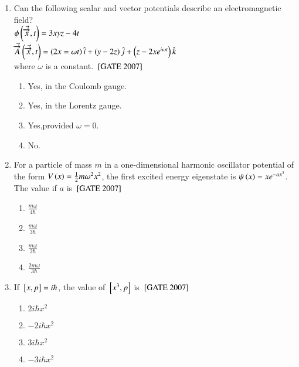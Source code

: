 \documentclass[journal]{IEEEtran}
\begin{document}
\begin{enumerate}
\begin{multicols}{4}
\begin{enumerate}
    \item $60$
    \item $120$
    \item $270$
\end{enumerate}
\end{multicols}
\item Can the following scalar and vector potentials describe an electromagnetic field? \\
$\phi\left(\Vec{\overrightarrow{x}},t\right)=3xyz-4t$\\
$\Vec{\overrightarrow{A}}\left(\Vec{\overrightarrow{x}},t\right)= \left(2x=\omega t\right)\hat{i}+\left(y-2z\right)\hat{j}+\left(z-2xe^{i\omega t}\right)\hat{k}$\\
where $\omega$ is a constant.
\hfill{${}\left[\text{GATE 2007}\right]$} \begin{multicols}{2}
\begin{enumerate}
    \item Yes, in the Coulomb gauge.
    \item Yes, in the Lorentz gauge.
    \item Yes,provided $\omega = 0$.
    \item No.
    
\end{enumerate}
\end{multicols}
\item For a particle of mass $m$ in a one-dimensional harmonic oscillator potential of the form $V\left(x\right)=\frac{1}{2}m\omega^2x^2$, the first excited energy eigenstate is $\psi\left(x\right) = xe^{-ax^2}$. The value if $a$ is \hfill{${}\left[\text{GATE 2007}\right]$} \begin{multicols}{4}    
\begin{enumerate}
    \item $\frac{m\omega}{4\hbar}$
    \item $\frac{m\omega}{3\hbar}$
    \item $\frac{m\omega}{2\hbar}$
    \item $\frac{2m\omega}{3\hbar}$
\end{enumerate}
\end{multicols}
\item If ${}\left[x,p\right]=i\hbar$, the value of ${}\left[x^3,p\right]$ is \hfill{${}\left[\text{GATE 2007}\right]$} 
\begin{multicols}{4}
\begin{enumerate}
    \item $2i\hbar x^2$
    \item $-2i\hbar x^2$
    \item $3i\hbar x^2$
    \item $-3i\hbar x^2$
    

\end{enumerate}
\end{multicols}
\end{enumerate}
\end{document}
